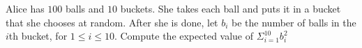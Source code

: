Alice has $100$ balls and $10$ buckets. She takes each ball and puts it in a bucket that she chooses at random. After she is done, let $b_i$ be the number of balls in the $i$th bucket, for  $1\le i \le 10$. Compute the expected value of $\Sigma_{i=1}^{10}b_i^2$
